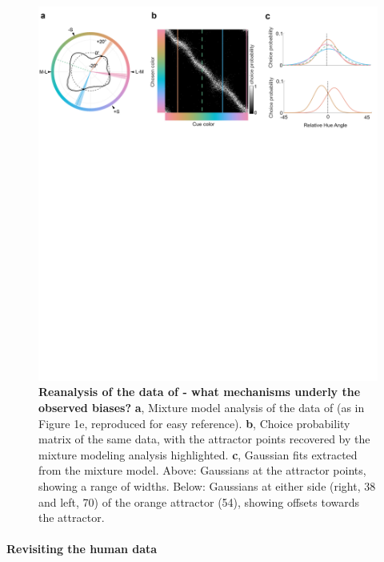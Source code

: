\documentclass[9pt,biorxiv,lineno,onehalfspacing]{lapreprint}
\begin{document}
\begin{refsection}
\begin{figure}
    \begin{fullwidth}
    \centering
    \includegraphics[width=\textwidth+4cm,trim={0 18cm 0 0},clip]{F5b_HumanMainText_3.pdf}
    \caption{\textbf {Reanalysis of the data of \citet{bae_why_2015} - what mechanisms underly the observed biases?}
    \textbf{a}, Mixture model analysis of the data of \citet{bae_why_2015} (as in Figure 1e, reproduced for easy reference).
    \textbf{b}, Choice probability matrix of the same data, with the attractor points recovered by the mixture modeling analysis highlighted.
    \textbf{c}, Gaussian fits extracted from the mixture model. 
    Above: Gaussians at the attractor points, showing a range of widths. 
    Below: Gaussians at either side (right, 38\degree{} and left, 70\degree{}) of the orange attractor (54\degree{}), showing offsets towards the attractor.}
    \label{fig:HumanMainText}
    \end{fullwidth}
\end{figure}

\paragraph{Revisiting the human data}


\end{refsection}
\end{document}
